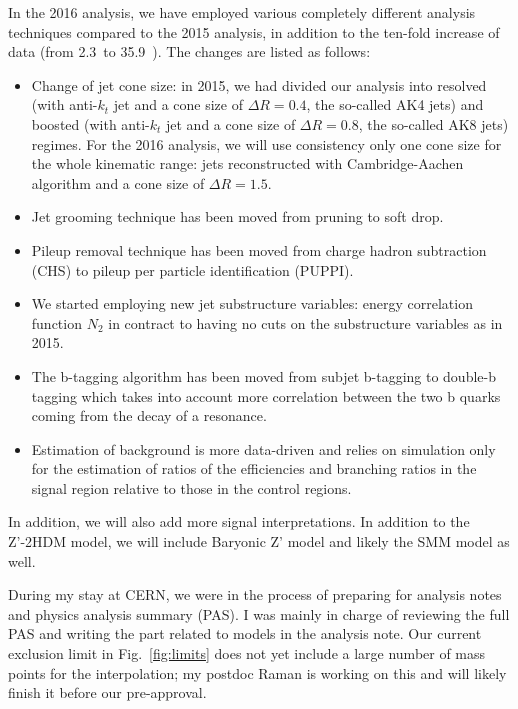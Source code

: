 In the 2016 analysis, we have employed various completely different analysis techniques compared to the 2015 analysis, 
in addition to the ten-fold increase of data (from 2.3~\fbinv to 35.9~\fbinv). The changes are listed as follows:
\begin{itemize}
\item Change of jet cone size: in 2015, we had divided our analysis into resolved (with anti-$k_t$ jet and a cone size of 
$\Delta R=0.4$, the so-called AK4 jets) and boosted (with anti-$k_t$ jet and a cone size of $\Delta R=0.8$, the so-called AK8 jets) 
regimes. For the 2016 analysis, we will use consistency only one cone size for the whole kinematic range: jets reconstructed with 
Cambridge-Aachen algorithm and a cone size of $\Delta R=1.5$.
\item Jet grooming technique has been moved from pruning to soft drop.
\item Pileup removal technique has been moved from charge hadron subtraction (CHS) to pileup per particle identification (PUPPI).
\item We started employing new jet substructure variables: energy correlation function $N_2$ in contract to having no cuts on the substructure variables as in 2015.
\item The b-tagging algorithm has been moved from subjet b-tagging to double-b tagging which takes into account more correlation 
between the two b quarks coming from the decay of a resonance.
\item Estimation of background is more data-driven and relies on simulation only for the estimation of ratios of the efficiencies and 
branching ratios in the signal region relative to those in the control regions.
\end{itemize}
In addition, we will also add more signal interpretations. In addition to the Z'-2HDM model, we will include Baryonic Z' model and 
likely the SMM model as well.

During my stay at CERN, we were in the process of preparing for analysis notes and physics analysis summary (PAS). I was mainly in 
charge of reviewing the full PAS and writing the part related to models in the analysis note. Our current exclusion limit in 
Fig.~\ref{fig:limits} does not yet include a large number of mass points for the interpolation; my postdoc Raman is working on 
this and will likely finish it before our pre-approval.

